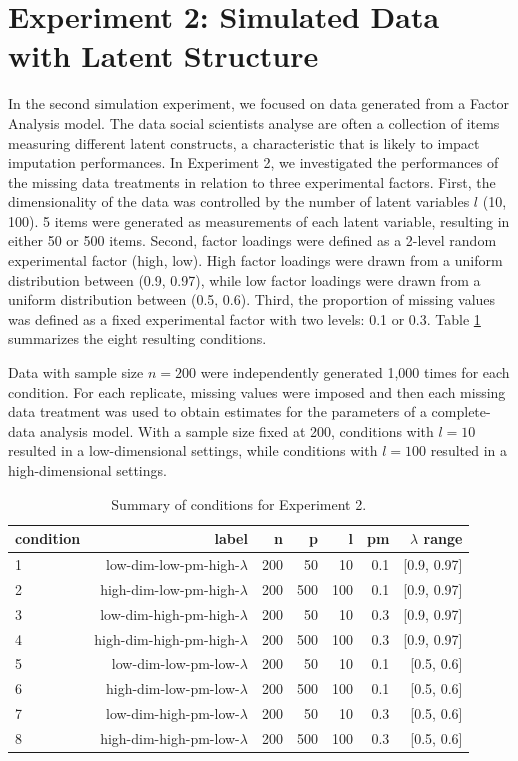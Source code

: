 \section{Experiment 2: Simulated Data with Latent Structure}

In the second simulation experiment, we focused on data generated from a Factor Analysis model.
The data social scientists analyse are often a collection of items measuring different latent constructs, 
a characteristic that is likely to impact imputation performances.
In Experiment 2, we investigated the performances of the missing data treatments in relation to three experimental factors.
First, the dimensionality of the data was controlled by the number of latent variables $l$ (10, 100).
5 items were generated as measurements of each latent variable, resulting in either 50 or 500 items.
Second, factor loadings were defined as a 2-level random experimental factor (high, low).
High factor loadings were drawn from a uniform distribution between (0.9, 0.97), while low factor loadings
were drawn from a uniform distribution between (0.5, 0.6).
Third, the proportion of missing values was defined as a fixed experimental factor with two levels: 0.1 or 0.3.
Table \ref{tab:condExp2} summarizes the eight resulting conditions.

Data with sample size $n=200$ were independently generated 1,000 times for each condition.
For each replicate, missing values were imposed and then each missing data treatment was used to obtain estimates 
for the parameters of a complete-data analysis model.
With a sample size fixed at 200, conditions with $l = 10$ resulted in a low-dimensional settings, while conditions 
with $l = 100$ resulted in a high-dimensional settings.

\begin{table}
	\centering
	\begin{tabular}{l | r | r | r | r | r | r }
		condition & label & n & p & l & pm & $\lambda$ range \\
		\hline
		1 & low-dim-low-pm-high-$\lambda$ & 200 & 50 &  10 &  0.1 & [0.9, 0.97] \\
		2 & high-dim-low-pm-high-$\lambda$ & 200 & 500 & 100 & 0.1 & [0.9, 0.97] \\
		3 & low-dim-high-pm-high-$\lambda$ & 200 & 50 &  10 &  0.3 & [0.9, 0.97] \\
		4 & high-dim-high-pm-high-$\lambda$ & 200 & 500 & 100 & 0.3 & [0.9, 0.97] \\
		5 & low-dim-low-pm-low-$\lambda$ & 200 & 50 &  10 &  0.1 & [0.5, 0.6]  \\
		6 & high-dim-low-pm-low-$\lambda$ & 200 & 500 & 100 & 0.1 & [0.5, 0.6]  \\
		7 & low-dim-high-pm-low-$\lambda$ & 200 & 50 &  10 &  0.3 & [0.5, 0.6]  \\
		8 & high-dim-high-pm-low-$\lambda$ & 200 & 500 & 100 & 0.3 & [0.5, 0.6]  \\
	\end{tabular}
	\caption{\label{tab:condExp2}Summary of conditions for Experiment 2.}
\end{table}

